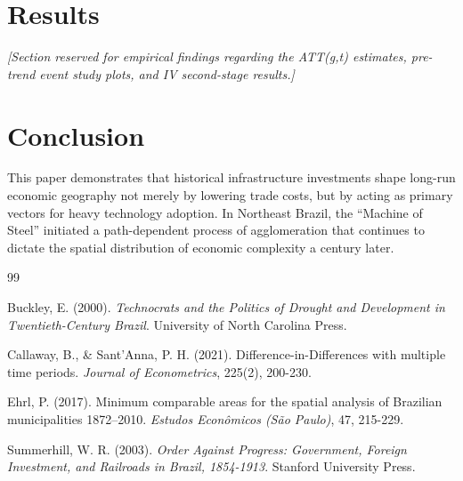 \documentclass[11pt, a4paper]{article}
\begin{document}
\section{Results}
\textit{[Section reserved for empirical findings regarding the ATT(g,t) estimates, pre-trend event study plots, and IV second-stage results.]}

\section{Conclusion}
This paper demonstrates that historical infrastructure investments shape long-run economic geography not merely by lowering trade costs, but by acting as primary vectors for heavy technology adoption. In Northeast Brazil, the ``Machine of Steel'' initiated a path-dependent process of agglomeration that continues to dictate the spatial distribution of economic complexity a century later.


\begin{thebibliography}{99}

Buckley, E. (2000). \textit{Technocrats and the Politics of Drought and Development in Twentieth-Century Brazil}. University of North Carolina Press.

Callaway, B., \& Sant'Anna, P. H. (2021). Difference-in-Differences with multiple time periods. \textit{Journal of Econometrics}, 225(2), 200-230.

Ehrl, P. (2017). Minimum comparable areas for the spatial analysis of Brazilian municipalities 1872--2010. \textit{Estudos Econômicos (São Paulo)}, 47, 215-229.

Summerhill, W. R. (2003). \textit{Order Against Progress: Government, Foreign Investment, and Railroads in Brazil, 1854-1913}. Stanford University Press.

\end{thebibliography}
\end{document}

